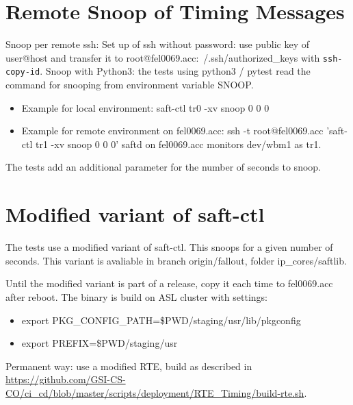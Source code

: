 \documentclass[12pt,a4paper]{report}
\begin{document}
\section{Remote Snoop of Timing Messages}
Snoop per remote ssh: Set up of ssh without password: use public key of user@host and transfer it to root@fel0069.acc:~/.ssh/authorized\_keys with \texttt{ssh-copy-id}.
Snoop with Python3: the tests using python3 / pytest read the command for snooping from environment variable SNOOP.
\begin{itemize}
\item Example for local environment: saft-ctl tr0 -xv snoop 0 0 0
\item Example for remote environment on fel0069.acc: ssh -t root@fel0069.acc 'saft-ctl tr1 -xv snoop 0 0 0' \linebreak
saftd on fel0069.acc monitors dev/wbm1 as tr1.
\end{itemize}
The tests add an additional parameter for the number of seconds to snoop.

\section{Modified variant of saft-ctl}
The tests use a modified variant of saft-ctl. This snoops for a given number of seconds. This variant is avaliable in branch origin/fallout, folder ip\_cores/saftlib.

Until the modified variant is part of a release, copy it each time to fel0069.acc after reboot. The binary is build on ASL cluster with settings:
\begin{itemize}
\item export PKG\_CONFIG\_PATH=\$PWD/staging/usr/lib/pkgconfig
\item export PREFIX=\$PWD/staging/usr
\end{itemize}

Permanent way: use a modified RTE, build as described in
\url{https://github.com/GSI-CS-CO/ci\_cd/blob/master/scripts/deployment/RTE\_Timing/build-rte.sh}.
\end{document}
